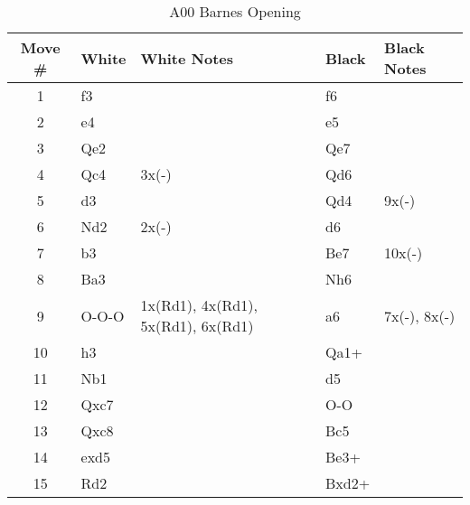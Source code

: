 \begin{table}[htbp]
\centering
\scriptsize
\caption[]{A00 Barnes Opening}
\begin{tabular}{|c|l|p{5cm}|l|p{5cm}|}
\hline
\textbf{Move \#} & \textbf{White} & \textbf{White Notes} & \textbf{Black} & \textbf{Black Notes} \\
\hline
1  & f3      &                   & f6      &                        \\
2  & e4      &                   & e5      &                        \\
3  & Qe2     &                   & Qe7     &                        \\
4  & Qc4     & 3x(-)             & Qd6     &                        \\
5  & d3      &                   & Qd4     & 9x(-)                  \\
6  & Nd2     & 2x(-)             & d6      &                        \\
7  & b3      &                   & Be7     & 10x(-)                 \\
8  & Ba3     &                   & Nh6     &                        \\
9  & O-O-O   & 1x(Rd1), 4x(Rd1), 5x(Rd1), 6x(Rd1) & a6      & 7x(-), 8x(-)           \\
10 & h3      &                   & Qa1+    &                        \\
11 & Nb1     &                   & d5      &                        \\
12 & Qxc7    &                   & O-O     &                        \\
13 & Qxc8    &                   & Bc5     &                        \\
14 & exd5    &                   & Be3+    &                        \\
15 & Rd2     &                   & Bxd2+   &                        \\
\hline
\end{tabular}
\end{table}
